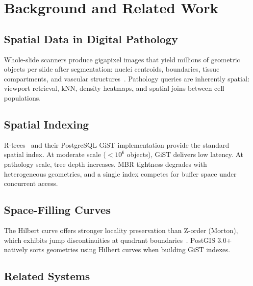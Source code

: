 \documentclass[10pt,twocolumn]{article}
\begin{document}
\section{Background and Related Work}
\label{sec:background}

\subsection{Spatial Data in Digital Pathology}

Whole-slide scanners produce gigapixel images that yield millions of geometric objects per slide after segmentation: nuclei centroids, boundaries, tissue compartments, and vascular structures~\cite{saltz2018spatial}.
Pathology queries are inherently spatial: viewport retrieval, kNN, density heatmaps, and spatial joins between cell populations.

\subsection{Spatial Indexing}

R-trees~\cite{guttman1984r} and their PostgreSQL GiST implementation provide the standard spatial index.
At moderate scale ($<10^6$ objects), GiST delivers low latency.
At pathology scale, tree depth increases, MBR tightness degrades with heterogeneous geometries, and a single index competes for buffer space under concurrent access.

\subsection{Space-Filling Curves}

The Hilbert curve offers stronger locality preservation than Z-order (Morton), which exhibits jump discontinuities at quadrant boundaries~\cite{kamel1994hilbert,lawder2000calculation,moon2001analysis}.
PostGIS 3.0+ natively sorts geometries using Hilbert curves when building GiST indexes.

\subsection{Related Systems}
\end{document}
